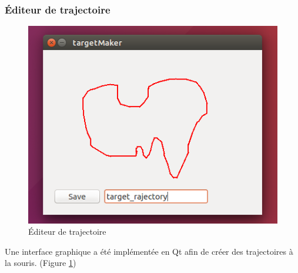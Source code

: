\subsubsection{Éditeur de trajectoire}
\begin{figure}
 \centering
 \includegraphics[scale=0.6]{../figures/targettrajectory.png}
 \caption{Éditeur de trajectoire}
 \label{fig:targettrajectory}
\end{figure}
Une interface graphique a été implémentée en Qt afin de créer des trajectoires à la souris. (Figure \ref{fig:targettrajectory})
